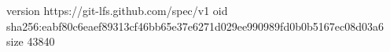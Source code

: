 version https://git-lfs.github.com/spec/v1
oid sha256:eabf80c6eaef89313cf46bb65e37e6271d029ee990989fd0b0b5167ec08d03a6
size 43840

